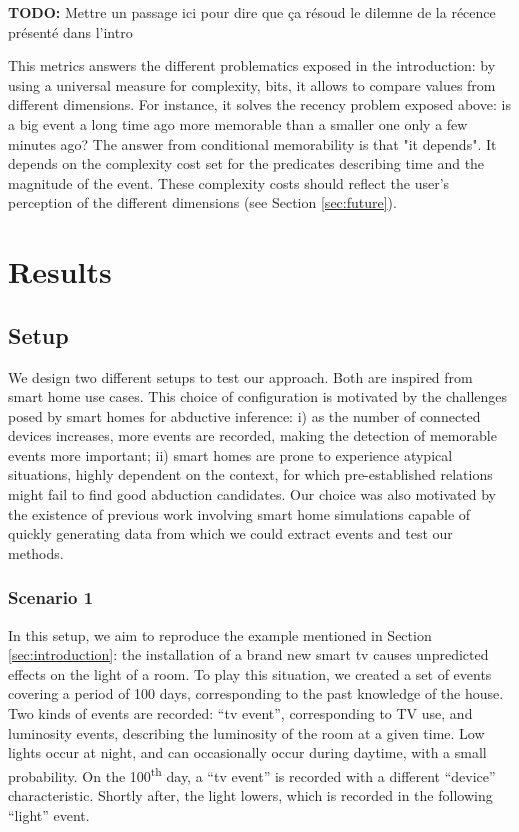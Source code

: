 \documentclass[entropy,article,submit,moreauthors,pdftex]{Definitions/mdpi}
\begin{document}
\textbf{TODO:} Mettre un passage ici pour dire que ça résoud le dilemne de la récence présenté dans l'intro

This metrics answers the different problematics exposed in the introduction: by using a universal measure for complexity, bits, it allows to compare values from different dimensions. For instance, it solves the recency problem exposed above: is a big event a long time ago more memorable than a smaller one only a few minutes ago? The answer from conditional memorability is that "it depends". It depends on the complexity cost set for the predicates describing time and the magnitude of the event. These complexity costs should reflect the user's perception of the different dimensions (see Section \ref{sec:future}).


\section{Results}

\subsection{Setup}

We design two different setups to test our approach. Both are inspired from smart home use cases.  This choice of
configuration is motivated by the challenges posed by smart homes for abductive
inference: i) as the number of connected devices increases, more events are
recorded, making the detection of memorable events more important; ii) smart
homes are prone to experience atypical situations, highly dependent on the context,
for which pre-established relations might fail to find good abduction
candidates. Our choice was also motivated by
the existence of previous work involving smart home simulations capable of quickly generating data from which we could extract events and test our methods.

\subsubsection{Scenario 1}
In this setup, we aim to reproduce the example mentioned in Section \ref{sec:introduction}: the installation of a brand new smart tv causes unpredicted effects on the light of a room.
To play this situation, we created a set of events covering a period of 100 days, corresponding to the past knowledge of the house. Two kinds of events are recorded: ``tv event'', corresponding to TV use, and luminosity events, describing the luminosity of the room at a given time. Low lights occur at night, and can occasionally occur during daytime, with a small probability. On the 100\textsuperscript{th} day, a ``tv event'' is recorded with a different ``device'' characteristic. Shortly after, the light lowers, which is recorded in the following ``light'' event.
\end{document}
